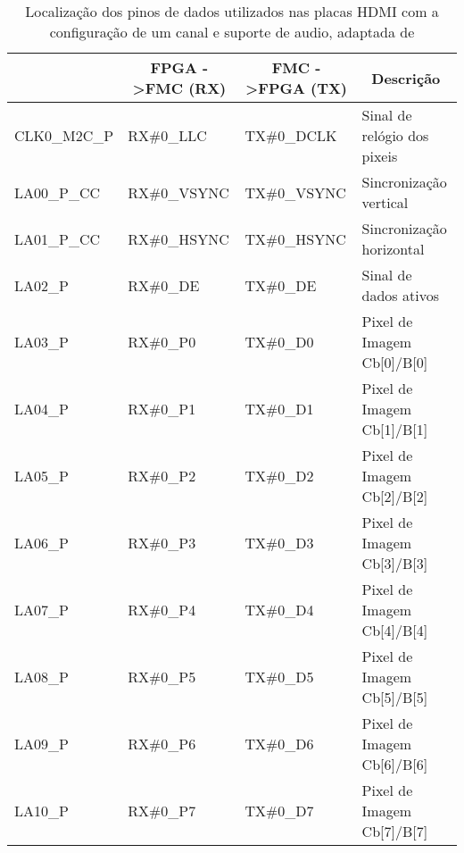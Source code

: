 \begin{longtable}[]
	{@{}llll@{}}
	\caption{Localização dos pinos de dados utilizados nas placas HDMI com a configuração de um canal e suporte de audio, adaptada de \cite{R014}}
	\label{table:HDMI1canal+audioDETAIL}
	\hline
	\centering
		\multicolumn{1}{c}{\textbf{PORTA}} & \multicolumn{1}{c}{\textbf{FPGA -\textgreater FMC (RX)}} & \multicolumn{1}{c}{\textbf{FMC -\textgreater FPGA (TX)}} & \multicolumn{1}{c}{\textbf{Descrição}} \\ \hline \endhead		
		CLK0\_M2C\_P & RX\#0\_LLC                         & TX\#0\_DCLK                          & Sinal de relógio dos pixeis          \\ 
		LA00\_P\_CC  & RX\#0\_VSYNC                       & TX\#0\_VSYNC                         & Sincronização vertical               \\ 
		LA01\_P\_CC  & RX\#0\_HSYNC                       & TX\#0\_HSYNC                         & Sincronização horizontal             \\ 
		LA02\_P      & RX\#0\_DE                          & TX\#0\_DE                            & Sinal de dados ativos                \\ 
		LA03\_P      & RX\#0\_P0                          & TX\#0\_D0                            & Pixel de Imagem Cb{[}0{]}/B{[}0{]}   \\ 
		LA04\_P      & RX\#0\_P1                          & TX\#0\_D1                            & Pixel de Imagem Cb{[}1{]}/B{[}1{]}   \\ 
		LA05\_P      & RX\#0\_P2                          & TX\#0\_D2                            & Pixel de Imagem Cb{[}2{]}/B{[}2{]}   \\ 
		LA06\_P      & RX\#0\_P3                          & TX\#0\_D3                            & Pixel de Imagem Cb{[}3{]}/B{[}3{]}   \\ 
		LA07\_P      & RX\#0\_P4                          & TX\#0\_D4                            & Pixel de Imagem Cb{[}4{]}/B{[}4{]}   \\ 
		LA08\_P      & RX\#0\_P5                          & TX\#0\_D5                            & Pixel de Imagem Cb{[}5{]}/B{[}5{]}   \\ 
		LA09\_P      & RX\#0\_P6                          & TX\#0\_D6                            & Pixel de Imagem Cb{[}6{]}/B{[}6{]}   \\ 
		LA10\_P      & RX\#0\_P7                          & TX\#0\_D7                            & Pixel de Imagem Cb{[}7{]}/B{[}7{]}   \\ 

\end{longtable}
